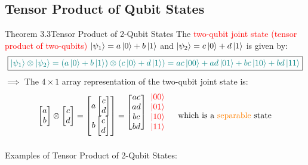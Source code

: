 \documentclass{book}
\begin{document}
\subsection{Tensor Product of Qubit States}
\begin{thmBox}{Theorem 3.3}{Tensor Product of 2-Qubit States}
    The \textcolor{red}{two-qubit joint state (tensor product of two-qubits)} $\ket{\psi_1} = a\ket{0} + b\ket{1}$ and $\ket{\psi_2} = c\ket{0} + d\ket{1}$ is given by:
    \[
        \boxed{\textcolor{teal}{\ket{\psi_1} \otimes \ket{\psi_2} = (a\ket{0} + b\ket{1}) \otimes (c\ket{0} + d\ket{1}) = ac\ket{00} + ad\ket{01} + bc\ket{10} + bd\ket{11}}}
    \]
    $\implies$ The $4 \times 1$ array representation of the two-qubit joint state is:
    \[
        \begin{bmatrix} a \\ b \end{bmatrix} \otimes \begin{bmatrix} c \\ d \end{bmatrix} = \begin{bmatrix} a \begin{bmatrix} c \\ d \end{bmatrix} \\ b \begin{bmatrix} c \\ d \end{bmatrix} \end{bmatrix} = \begin{blockarray}{cc}
            \begin{block}{[c]c}
                ac & \textcolor{red}{\ket{00}} \\
                ad & \textcolor{red}{\ket{01}} \\
                bc & \textcolor{red}{\ket{10}} \\
                bd & \textcolor{red}{\ket{11}} \\
            \end{block}  
        \end{blockarray}\quad \text{which is a \textcolor{orange}{separable} state}
    \]
\end{thmBox}
Examples of Tensor Product of 2-Qubit States:
\end{document}
